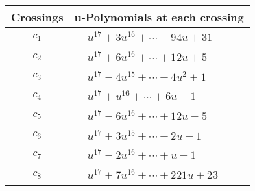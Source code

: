 \documentclass[1p]{elsarticle_modified}
\theoremstyle{definition}
\begin{document}
\begin{tabular}{m{50pt}|m{274pt}}
Crossings & \hspace{64pt}u-Polynomials at each crossing \\
\hline $$\begin{aligned}c_{1}\end{aligned}$$&$\begin{aligned}
&u^{17}+3 u^{16}+\cdots-94 u+31
\end{aligned}$\\
\hline $$\begin{aligned}c_{2}\end{aligned}$$&$\begin{aligned}
&u^{17}+6 u^{16}+\cdots+12 u+5
\end{aligned}$\\
\hline $$\begin{aligned}c_{3}\end{aligned}$$&$\begin{aligned}
&u^{17}-4 u^{15}+\cdots-4 u^2+1
\end{aligned}$\\
\hline $$\begin{aligned}c_{4}\end{aligned}$$&$\begin{aligned}
&u^{17}+u^{16}+\cdots+6 u-1
\end{aligned}$\\
\hline $$\begin{aligned}c_{5}\end{aligned}$$&$\begin{aligned}
&u^{17}-6 u^{16}+\cdots+12 u-5
\end{aligned}$\\
\hline $$\begin{aligned}c_{6}\end{aligned}$$&$\begin{aligned}
&u^{17}+3 u^{15}+\cdots-2 u-1
\end{aligned}$\\
\hline $$\begin{aligned}c_{7}\end{aligned}$$&$\begin{aligned}
&u^{17}-2 u^{16}+\cdots+u-1
\end{aligned}$\\
\hline $$\begin{aligned}c_{8}\end{aligned}$$&$\begin{aligned}
&u^{17}+7 u^{16}+\cdots+221 u+23
\end{aligned}$\\

\end{tabular}
\end{document}
